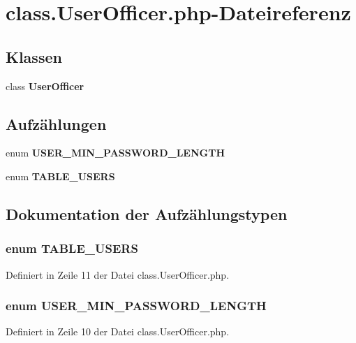 \section{class.UserOfficer.php-Dateireferenz}
\label{class_8UserOfficer_8php}
\subsection*{Klassen}
\begin{CompactItemize}
\item 
class {\bf UserOfficer}
\end{CompactItemize}
\subsection*{Aufzählungen}
\begin{CompactItemize}
\item 
enum {\bf USER\_\-MIN\_\-PASSWORD\_\-LENGTH} 
\item 
enum {\bf TABLE\_\-USERS} 
\end{CompactItemize}


\subsection{Dokumentation der Aufzählungstypen}
\subsubsection{\setlength{\rightskip}{0pt plus 5cm}enum {\bf TABLE\_\-USERS}}\label{class_8UserOfficer_8php_4569193c2d65adce885695208c0bcb1e}




Definiert in Zeile 11 der Datei class.UserOfficer.php.
\subsubsection{\setlength{\rightskip}{0pt plus 5cm}enum {\bf USER\_\-MIN\_\-PASSWORD\_\-LENGTH}}\label{class_8UserOfficer_8php_68c6bc16c19b331b4afb7e5090366df7}




Definiert in Zeile 10 der Datei class.UserOfficer.php.
